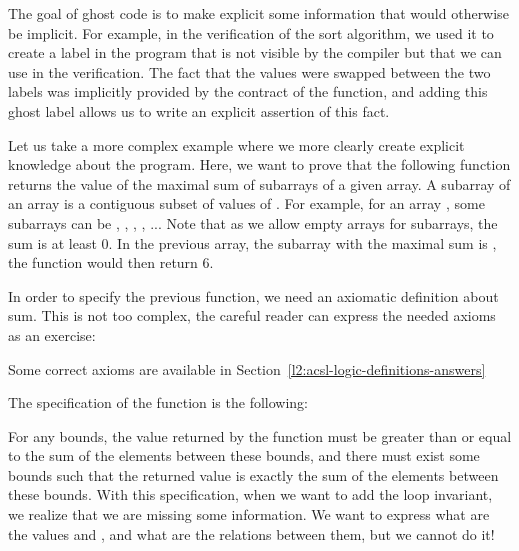 

The goal of ghost code is to make explicit some information that would otherwise
be implicit. For example, in the verification of the sort algorithm, we used it
to create a label in the program that is not visible by the compiler but that
we can use in the verification. The fact that the values were swapped between the
two labels was implicitly provided by the contract of the function, and adding this
ghost label allows us to write an explicit assertion of this fact.



Let us take a more complex example where we more clearly create explicit
knowledge about the program. Here, we want to prove that the
following function returns the value of the maximal sum of subarrays of
a given array. A subarray of an array  is a contiguous subset
of values of . For example, for an array ,
some subarrays can be
\CodeInline{\{\}}, , ,
, ... Note that as we allow
empty arrays for subarrays, the sum is at least 0. In the previous
array, the subarray with the maximal sum is ,
the function would then return 6.






In order to specify the previous function, we need an axiomatic
definition about sum. This is not too complex, the careful reader
can express the needed axioms as an exercise:






Some correct axioms are available in Section~\ref{l2:acsl-logic-definitions-answers}



The specification of the function is the following:






For any bounds, the value returned by the function must be greater than or
equal to the sum of the elements between these bounds, and there must
exist some bounds such that the returned value is exactly the sum of the
elements between these bounds. With this specification, when we want to
add the loop invariant, we realize that we are missing some information.
We want to express what are the values  and ,
and what are the relations between them, but we cannot do it!


